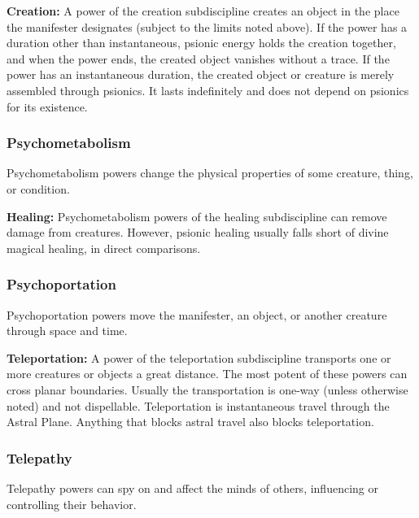 \textbf{Creation:} A power of the creation subdiscipline creates an object in the place the manifester designates (subject to the limits noted above). If the power has a duration other than instantaneous, psionic energy holds the creation together, and when the power ends, the created object vanishes without a trace. If the power has an instantaneous duration, the created object or creature is merely assembled through psionics. It lasts indefinitely and does not depend on psionics for its existence.


\subsubsection{Psychometabolism}
Psychometabolism powers change the physical properties of some creature, thing, or condition.


\textbf{Healing:} Psychometabolism powers of the healing subdiscipline can remove damage from creatures. However, psionic healing usually falls short of divine magical healing, in direct comparisons.

\subsubsection{Psychoportation}
Psychoportation powers move the manifester, an object, or another creature through space and time.


\textbf{Teleportation:} A power of the teleportation subdiscipline transports one or more creatures or objects a great distance. The most potent of these powers can cross planar boundaries. Usually the transportation is one-way (unless otherwise noted) and not dispellable. Teleportation is instantaneous travel through the Astral Plane. Anything that blocks astral travel also blocks teleportation.

\subsubsection{Telepathy}
Telepathy powers can spy on and affect the minds of others, influencing or controlling their behavior.

